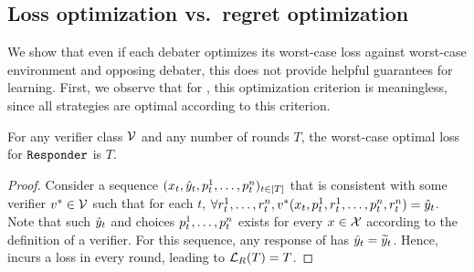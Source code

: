 \documentclass[anon]{alt2027} %
\begin{document}
\subsection{Loss optimization vs.~regret optimization}

We show that even if each debater optimizes its worst-case loss against worst-case environment and opposing debater, this does not provide helpful guarantees for learning. 
First, we observe that for \dt, this optimization criterion is  meaningless, since all \dt strategies are optimal according to this criterion. 

\begin{claim}\label{claim:deb2}
    For any verifier class ${\mathcal V}$ and any number of rounds $T$, the worst-case optimal loss for $\texttt{Responder}$ is $T$. 
\end{claim}
\begin{proof}
Consider a sequence $(x_t,{\hat{y}}_t,{p}_t^1, \ldots, {p}_t^n)_{t \in [T]}$ that is consistent with some verifier $v^* \in {\mathcal V}$ such that for each $t$, $\forall {r}_t^1, \ldots, {r}_t^n, v^*(x_t, {p}_t^1,{r}_t^1, \ldots, {p}_t^n, {r}_t^n) = {\hat{y}}_t$. Note that such ${\hat{y}}_t$ and choices ${p}_t^1, \ldots, {p}_t^n$ exists for every $x \in {\mathcal X}$ according to the definition of a verifier. 
For this sequence, any response of \df has ${\hat{y}}_t = {\widetilde{y}}_t$. Hence, \df incurs a loss in every round, leading to ${{\mathcal L}_R}(T) = T$.
\end{proof}
\end{document}
